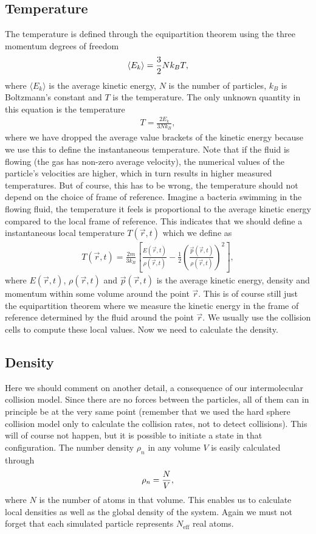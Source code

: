 \subsection{Temperature}
The temperature is defined through the equipartition theorem using the three momentum degrees of freedom
\begin{align}
	\langle E_k \rangle = {3\over 2}Nk_BT,
\end{align}
where $\langle E_k \rangle$ is the average kinetic energy, $N$ is the number of particles, $k_B$ is Boltzmann's constant and $T$ is the temperature. The only unknown quantity in this equation is the temperature
\begin{align}
	\label{eq:dsmc_temperature}
	T = \frac{2E_k}{3Nk_B},
\end{align}
where we have dropped the average value brackets of the kinetic energy because we use this to define the instantaneous temperature. Note that if the fluid is flowing (the gas has non-zero average velocity), the numerical values of the particle's velocities are higher, which in turn results in higher measured temperatures. But of course, this has to be wrong, the temperature should not depend on the choice of frame of reference. Imagine a bacteria swimming in the flowing fluid, the temperature it feels is proportional to the average kinetic energy compared to the local frame of reference. This indicates that we should define a instantaneous local temperature $T(\vec r, t)$ which we define as
\begin{align}
	\label{eq:dsmc_local_temperature}
	T(\vec r, t) = \frac{2m}{3k_B}\left[\frac{E(\vec r, t)}{\rho(\vec r, t)} - \frac{1}{2}\left(\frac{\vec p(\vec r, t)}{\rho(\vec r, t)}\right)^2\right],
\end{align}
where $E(\vec r,t)$, $\rho(\vec r,t)$ and $\vec p(\vec r,t)$ is the average kinetic energy, density and momentum within some volume around the point $\vec r$. This is of course still just the equipartition theorem where we measure the kinetic energy in the frame of reference determined by the fluid around the point $\vec r$. We usually use the collision cells to compute these local values. Now we need to calculate the density.
\subsection{Density}
Here we should comment on another detail, a consequence of our intermolecular collision model. Since there are no forces between the particles, all of them can in principle be at the very same point (remember that we used the hard sphere collision model only to calculate the collision rates, not to detect collisions). This will of course not happen, but it is possible to initiate a state in that configuration. The number density $\rho_n$ in any volume $V$ is easily calculated through
\begin{align}
	\rho_n = {N \over V},
\end{align}
where $N$ is the number of atoms in that volume. This enables us to calculate local densities as well as the global density of the system. Again we must not forget that each simulated particle represents $N_\text{eff}$ real atoms.
